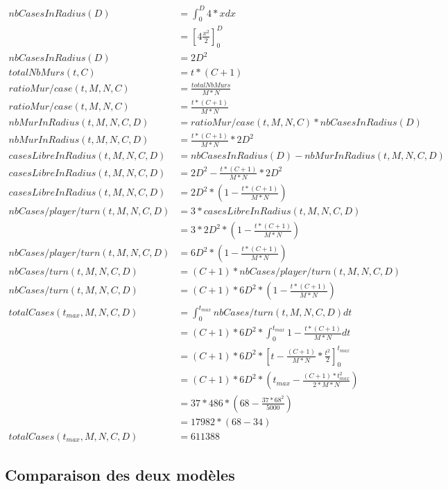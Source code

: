 		\begin{align}
			nbCasesInRadius(D) &=\int_{0}^{D} 4*x dx\\
			&= [4\frac{x^2}{2}]_{0}^{D}\\
			nbCasesInRadius(D) &= 2D^2\\
			totalNbMurs(t,C) &= t*(C+1)\\
			ratioMur/case(t, M, N, C)&= \frac{totalNbMurs}{M*N}\\
			ratioMur/case(t, M, N, C)&= \frac{t*(C+1)}{M*N}\\
			nbMurInRadius(t,M,N,C,D)&=ratioMur/case(t, M, N, C)*nbCasesInRadius(D)\\
			nbMurInRadius(t,M,N,C,D)&=\frac{t*(C+1)}{M*N}*2D^2\\
			casesLibreInRadius(t,M,N,C,D)&=nbCasesInRadius(D) - nbMurInRadius(t,M,N,C,D)\\
			casesLibreInRadius(t,M,N,C,D)&=2D^2-\frac{t*(C+1)}{M*N}*2D^2\\
			casesLibreInRadius(t,M,N,C,D)&=2D^2*(1 - \frac{t*(C+1)}{M*N})\\
			nbCases/player/turn(t,M,N,C,D) &= 3*casesLibreInRadius(t,M,N,C,D)\\
			&= 3*2D^2*(1 - \frac{t*(C+1)}{M*N})\\
			nbCases/player/turn(t,M,N,C,D) &= 6D^2*(1 - \frac{t*(C+1)}{M*N})\\
			nbCases/turn(t,M,N,C,D) &= (C+1)*nbCases/player/turn(t,M,N,C,D)\\
			nbCases/turn(t,M,N,C,D) &= (C+1)*6D^2*(1 - \frac{t*(C+1)}{M*N})\\
			totalCases(t_{max},M,N,C,D) &= \int_{0}^{t_{max}} nbCases/turn(t,M,N,C,D) dt\\
			&= (C+1)*6D^2* \int_{0}^{t_{max}} 1 - \frac{t*(C+1)}{M*N} dt\\
			&= (C+1) * 6D^2 * [ t - \frac{(C+1)}{M*N} * \frac{t^2}{2} ]_{0}^{t_{max}}\\
			&= (C+1) * 6D^2 * (t_{max} - \frac{(C+1)*t_{max}^2}{2*M*N})\\
			&= 37 * 486 *(68 - \frac{37*68^2}{5000})\\
			&= 17982 * (68 - 34)\\
			totalCases(t_{max},M,N,C,D) &= 611388
		\end{align}
		
		\subsection{Comparaison des deux modèles}
		
